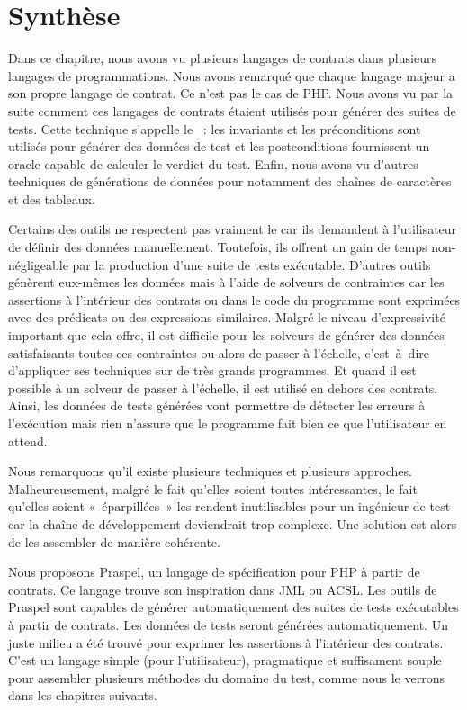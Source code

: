 \section{Synthèse}
\label{section:sota:summary}

Dans ce chapitre, nous avons vu plusieurs langages de contrats dans plusieurs
langages de programmations. Nous avons remarqué que chaque langage majeur a son
propre langage de contrat. Ce n'est pas le cas de PHP. Nous avons vu par la
suite comment ces langages de contrats étaient utilisés pour générer des suites
de tests. Cette technique s'appelle le ~: les
invariants et les préconditions sont utilisés pour générer des données de test
et les postconditions fournissent un oracle capable de calculer le verdict du
test. Enfin, nous avons vu d'autres techniques de générations de données pour
notamment des chaînes de caractères et des tableaux.

Certains des outils ne respectent pas vraiment le  car ils demandent à l'utilisateur de définir des données manuellement.
Toutefois, ils offrent un gain de temps non-négligeable par la production d'une
suite de tests exécutable. D'autres outils génèrent eux-mêmes les données mais à
l'aide de solveurs de contraintes car les assertions à l'intérieur des contrats
ou dans le code du programme sont exprimées avec des prédicats ou des
expressions similaires. Malgré le niveau d'expressivité important que cela
offre, il est difficile pour les solveurs de générer des données satisfaisants
toutes ces contraintes ou alors de passer à l'échelle, c'est~à~dire d'appliquer
ses techniques sur de très grands programmes. Et quand il est possible à un
solveur de passer à l'échelle, il est utilisé en dehors des contrats. Ainsi, les
données de tests générées vont permettre de détecter les erreurs à l'exécution
mais rien n'assure que le programme fait bien ce que l'utilisateur en attend.

Nous remarquons qu'il existe plusieurs techniques et plusieurs approches.
Malheureusement, malgré le fait qu'elles soient toutes intéressantes, le fait
qu'elles soient «~éparpillées~» les rendent inutilisables pour un ingénieur de
test car la chaîne de développement deviendrait trop complexe. Une solution est
alors de les assembler de manière cohérente.

Nous proposons Praspel, un langage de spécification pour PHP à partir de
contrats. Ce langage trouve son inspiration dans JML ou ACSL. Les outils de
Praspel sont capables de générer automatiquement des suites de tests exécutables
à partir de contrats. Les données de tests seront générées automatiquement. Un
juste milieu a été trouvé pour exprimer les assertions à l'intérieur des
contrats. C'est un langage simple (pour l'utilisateur), pragmatique et
suffisament souple pour assembler plusieurs méthodes du domaine du test, comme
nous le verrons dans les chapitres suivants.
